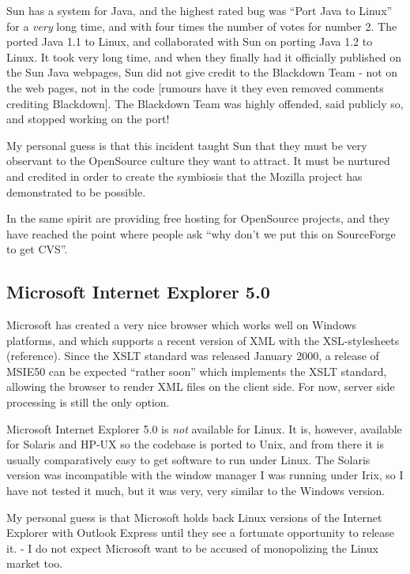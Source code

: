 Sun has a
 system for Java, and the
highest rated bug was ``Port Java to Linux'' for a \textit{very} long
time, and with four times the number of votes for number 2.  The
 ported Java 1.1 to
Linux, and collaborated with Sun on porting Java 1.2 to Linux.  It
took very long time, and when they finally had it officially published
on the Sun Java webpages, Sun did not give credit to the Blackdown
Team - not on the web pages, not in the code [rumours have it they
even removed comments crediting Blackdown].  The Blackdown Team was
highly offended, said publicly so, and stopped working on the port!

My personal guess is that this incident taught Sun that they must be
very observant to the OpenSource culture they want to attract.  It
must be nurtured and credited in order to create the symbiosis that
the Mozilla project has demonstrated to be possible.

In the same spirit 
are providing free hosting for OpenSource projects, and they have
reached the point where people ask ``why don't we put this on
SourceForge to get CVS''.

\subsection{Microsoft Internet Explorer 5.0}
\label{sec:microsoft-internet-explorer}

Microsoft has created a very nice browser which works well on Windows
platforms, and which supports a recent version of XML with the
XSL-stylesheets (\textsf{reference)}.  Since the XSLT standard was
released January 2000, a release of MSIE50 can be expected ``rather
soon'' which implements the XSLT standard, allowing the browser to
render XML files on the client side.  For now, server side processing
is still the only option.

Microsoft Internet Explorer 5.0 is \textit{not} available for Linux.
It is, however, available for Solaris and HP-UX so the codebase is
ported to Unix, and from there it is usually comparatively easy to get
software to run under Linux.  The Solaris version was incompatible
with the window manager I was running under Irix, so I have not tested
it much, but it was very, very similar to the Windows version.

My personal guess is that Microsoft holds back Linux versions of the
Internet Explorer with Outlook Express until they see a fortunate
opportunity to release it.   - I do not expect Microsoft want to
be accused of monopolizing the Linux market too.

